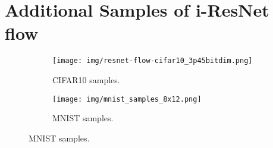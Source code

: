 \documentclass{article}
\begin{document}
\section{Additional Samples of i-ResNet flow}
\label{sec:mnist_samples}
\begin{figure}[h]
    \begin{subfigure}[b]{0.4\linewidth}
    \centering
    \texttt{[image: img/resnet-flow-cifar10\_3p45bitdim.png]}
    \caption*{CIFAR10 samples.}
    \end{subfigure}
    \begin{subfigure}[b]{0.4\linewidth}
    \centering
    \texttt{[image: img/mnist\_samples\_8x12.png]}
    \caption*{MNIST samples.}
     \end{subfigure}
\label{fig:my_label}
\end{figure}
\end{document}
